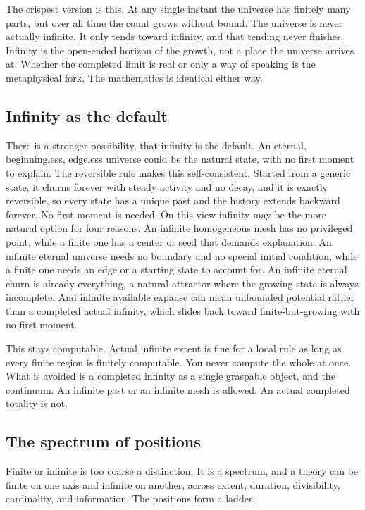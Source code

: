 The crispest version is this. At any single instant the universe has finitely many parts, but over all time the
count grows without bound. The universe is never actually infinite. It only tends toward infinity, and that
tending never finishes. Infinity is the open-ended horizon of the growth, not a place the universe arrives at.
Whether the completed limit is real or only a way of speaking is the metaphysical fork. The mathematics is
identical either way.

\subsection{Infinity as the default}

There is a stronger possibility, that infinity is the default. An eternal, beginningless, edgeless universe could
be the natural state, with no first moment to explain. The reversible rule makes this self-consistent. Started
from a generic state, it churns forever with steady activity and no decay, and it is exactly reversible, so every
state has a unique past and the history extends backward forever. No first moment is needed. On this view infinity
may be the more natural option for four reasons. An infinite homogeneous mesh has no privileged point, while a
finite one has a center or seed that demands explanation. An infinite eternal universe needs no boundary and no
special initial condition, while a finite one needs an edge or a starting state to account for. An infinite
eternal churn is already-everything, a natural attractor where the growing state is always incomplete. And
infinite available expanse can mean unbounded potential rather than a completed actual infinity, which slides back
toward finite-but-growing with no first moment.

This stays computable. Actual infinite extent is fine for a local rule as long as every finite region is finitely
computable. You never compute the whole at once. What is avoided is a completed infinity as a single graspable
object, and the continuum. An infinite past or an infinite mesh is allowed. An actual completed totality is not.

\subsection{The spectrum of positions}

Finite or infinite is too coarse a distinction. It is a spectrum, and a theory can be finite on one axis and
infinite on another, across extent, duration, divisibility, cardinality, and information. The positions form a
ladder.

